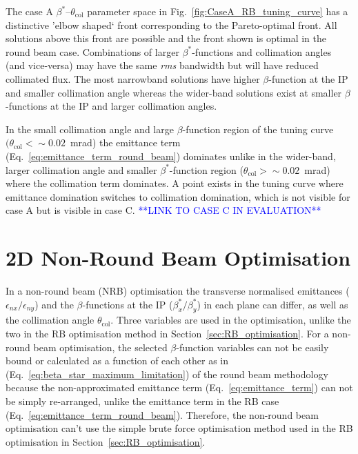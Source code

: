 \documentclass[../main.tex]{subfiles}
\begin{document}
The case A $\beta^{*}$--$\theta_{\mathrm{col}}$ parameter space in Fig.~\ref{fig:CaseA_RB_tuning_curve} has a distinctive 'elbow shaped` front corresponding to the Pareto-optimal front. All solutions above this front are possible and the front shown is optimal in the round beam case. Combinations of larger $\beta^{*}$-functions and collimation angles (and vice-versa) may have the same \textit{rms} bandwidth but will have reduced collimated flux. The most narrowband solutions have higher $\beta$-function at the IP and smaller collimation angle whereas the wider-band solutions exist at smaller $\beta$-functions at the IP and larger collimation angles. 

In the small collimation angle and large $\beta$-function region of the tuning curve $(\theta_{\mathrm{col}}< \sim0.02$~\si{\milli\radian}) the emittance term (Eq.~\ref{eq:emittance_term_round_beam}) dominates unlike in the wider-band, larger collimation angle and smaller $\beta^{*}$-function region ($\theta_\mathrm{col} > \sim0.02$~\si{\milli\radian}) where the collimation term dominates. A point exists in the tuning curve where emittance domination switches to collimation domination, which is not visible for case A but is visible in case C. \textcolor{blue}{**LINK TO CASE C IN EVALUATION**} 

\section{2D Non-Round Beam Optimisation}
\label{sec:NRB_optimisation}

In a non-round beam (NRB) optimisation the transverse normalised emittances ($\epsilon_{nx}/\epsilon_{ny}$) and the $\beta$-functions at the IP ($\beta_{x}^{*}/\beta_{y}^{*}$) in each plane can differ, as well as the collimation angle $\theta_{\mathrm{col}}$. Three variables are used in the optimisation, unlike the two in the RB optimisation method in Section~\ref{sec:RB_optimisation}. For a non-round beam optimisation, the selected $\beta$-function variables can not be easily bound or calculated as a function of each other as in (Eq.~\ref{eq:beta_star_maximum_limitation}) of the round beam methodology because the non-approximated emittance term (Eq.~\ref{eq:emittance_term}) can not be simply re-arranged, unlike the emittance term in the RB case (Eq.~\ref{eq:emittance_term_round_beam}). Therefore, the non-round beam optimisation can't use the simple brute force optimisation method used in the RB optimisation in Section~\ref{sec:RB_optimisation}.
\end{document}
